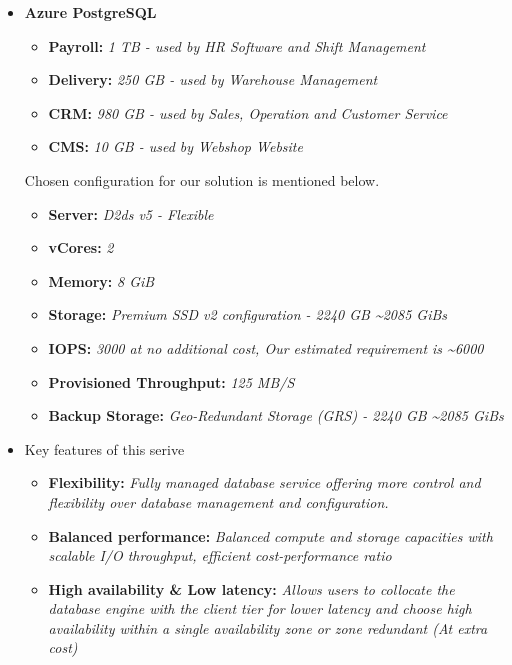 \documentclass{llncs}
\begin{document}
\begin{itemize}
    \item \textbf{Azure PostgreSQL} 
    \begin{itemize}
        \item \textbf{Payroll:} \textit{1 TB - used by HR Software and Shift Management}
        \item  \textbf{Delivery:} \textit{250 GB - used by Warehouse Management}
        \item  \textbf{CRM:} \textit{980 GB - used by Sales, Operation and Customer Service}
        \item  \textbf{CMS:} \textit{10 GB - used by Webshop Website}
    \end{itemize} \leavevmode\newline
    Chosen configuration for our solution is mentioned below.
    \begin{itemize}
        \item \textbf{Server:} \textit{D2ds v5 - Flexible}
        \item  \textbf{vCores:} \textit{2}
        \item  \textbf{Memory:} \textit{8 GiB}
        \item  \textbf{Storage:} \textit{Premium SSD v2 configuration - 2240 GB \textasciitilde 2085 GiBs}
        \item  \textbf{IOPS:} \textit{3000 at no additional cost, Our estimated requirement is \textasciitilde 6000}
        \item  \textbf{Provisioned Throughput:} \textit{125 MB/S}
        \item  \textbf{Backup Storage:} \textit{Geo-Redundant Storage (GRS) - 2240 GB \textasciitilde 2085 GiBs}
    \end{itemize}
    \item Key features of this serive
        \begin{itemize}
            \item  \textbf{Flexibility:} \textit{Fully managed database service offering more control and flexibility over database management and configuration.}
            \item  \textbf{Balanced performance:} \textit{Balanced compute and storage capacities with scalable I/O throughput, efficient cost-performance ratio}
            \item  \textbf{High availability \& Low latency:} \textit{Allows users to collocate the database engine with the client tier for lower latency and choose high availability within a single availability zone or zone redundant (At extra cost)}

\end{itemize}
\end{itemize}
\end{document}
